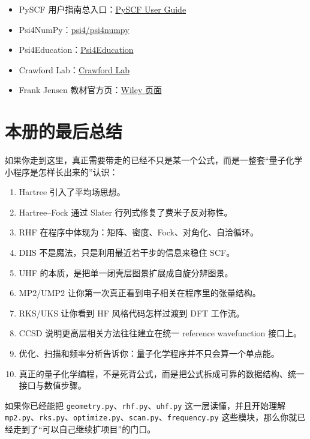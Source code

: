 \documentclass[UTF8,11pt,fontset=fandol]{ctexbook}
\begin{document}
\begin{resourcebox}[通用学习资料]
\begin{itemize}
  \item PySCF 用户指南总入口：\href{https://pyscf.org/user/index.html}{PySCF User Guide}
  \item Psi4NumPy：\href{https://github.com/psi4/psi4numpy}{psi4/psi4numpy}
  \item Psi4Education：\href{https://psicode.org/posts/psi4education/}{Psi4Education}
  \item Crawford Lab：\href{https://crawford.chem.vt.edu/}{Crawford Lab}
  \item Frank Jensen 教材官方页：\href{https://www.wiley-vch.de/en/areas-interest/natural-sciences/introduction-to-computational-chemistry-978-1-118-82599-0}{Wiley 页面}
\end{itemize}
\end{resourcebox}

\chapter{本册的最后总结}

如果你走到这里，真正需要带走的已经不只是某一个公式，而是一整套“量子化学小程序是怎样长出来的”认识：

\begin{enumerate}[label=\arabic*.]
  \item Hartree 引入了平均场思想。
  \item Hartree--Fock 通过 Slater 行列式修复了费米子反对称性。
  \item RHF 在程序中体现为：矩阵、密度、Fock、对角化、自洽循环。
  \item DIIS 不是魔法，只是利用最近若干步的信息来稳住 SCF。
  \item UHF 的本质，是把单一闭壳层图景扩展成自旋分辨图景。
  \item MP2/UMP2 让你第一次真正看到电子相关在程序里的张量结构。
  \item RKS/UKS 让你看到 HF 风格代码怎样过渡到 DFT 工作流。
  \item CCSD 说明更高层相关方法往往建立在统一 reference wavefunction 接口上。
  \item 优化、扫描和频率分析告诉你：量子化学程序并不只会算一个单点能。
  \item 真正的量子化学编程，不是死背公式，而是把公式拆成可靠的数据结构、统一接口与数值步骤。
\end{enumerate}

如果你已经能把 \texttt{geometry.py}、\texttt{rhf.py}、\texttt{uhf.py} 这一层读懂，并且开始理解 \texttt{mp2.py}、\texttt{rks.py}、\texttt{optimize.py}、\texttt{scan.py}、\texttt{frequency.py} 这些模块，那么你就已经走到了“可以自己继续扩项目”的门口。
\end{document}
